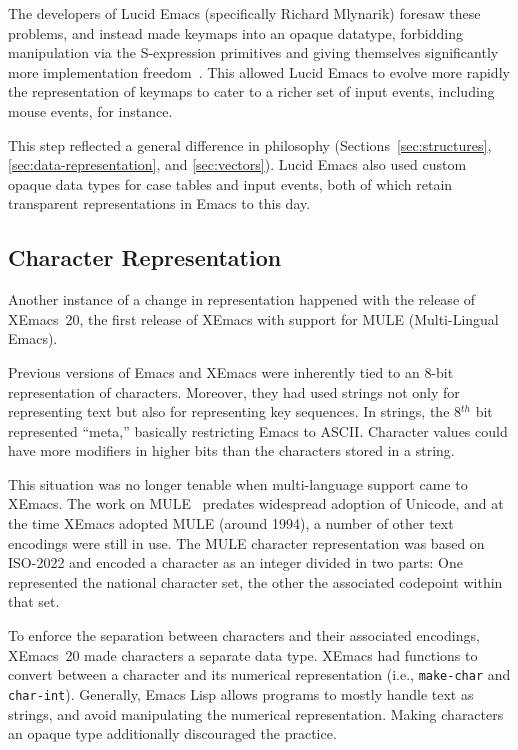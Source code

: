\documentclass[format=acmsmall,screen]{acmart}
\newcommand \Elisp {Emacs Lisp}
\begin{document}
The developers of Lucid Emacs (specifically Richard Mlynarik) foresaw these problems, and
instead made keymaps into an opaque datatype, forbidding manipulation via the
S-expression primitives and giving themselves significantly more implementation
freedom~\cite{Mlynarik-personal}.  This allowed Lucid Emacs to evolve more rapidly the
representation of keymaps to cater to a richer set of input events,
including mouse events, for instance.

This step reflected a general difference in philosophy
(Sections~\ref{sec:structures}, \ref{sec:data-representation}, and \ref{sec:vectors}).
Lucid Emacs also used custom opaque data types
for case tables and input events, both of which retain transparent
representations in Emacs to this day.

\subsection{Character Representation}
\label{sec:character-representation}

Another instance of a change in representation happened with the
release of XEmacs~20, the first release of XEmacs with support for
MULE (Multi-Lingual Emacs).

Previous versions of Emacs and XEmacs were inherently tied to an 8-bit
representation of characters.  Moreover, they had used strings not
only for representing text but also for representing key sequences.
In strings, the 8$^{th}$ bit represented ``meta,'' basically restricting
Emacs to ASCII.  Character values could have more
modifiers in higher bits than the characters stored in a string.

This situation was no longer tenable when multi-language support came
to XEmacs.  The work on MULE~\cite{Ohmaki2002} predates widespread
adoption of Unicode, and at the time XEmacs adopted MULE (around
1994), a number of other text encodings were still in use.  The MULE
character representation was based on ISO-2022 and encoded a character as an
integer divided in two parts: One represented the national character set,
the other the associated codepoint within that set.

To enforce the separation between characters and their associated
encodings, XEmacs~20 made characters a separate data type.  XEmacs had
functions to convert between a character and its numerical
representation (i.e., \texttt{make-char} and \texttt{char-int}).  Generally,
\Elisp{} allows programs to mostly handle text as strings,
and avoid manipulating the numerical representation.  Making
characters an opaque type additionally discouraged the practice.
\end{document}
